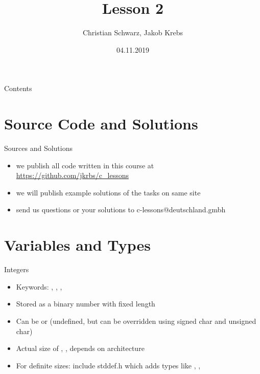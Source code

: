\documentclass[10pt,graphics,aspectratio=169,table]{beamer}
\title{Lesson 2}
\author{Christian Schwarz, Jakob Krebs}
\date{04.11.2019}
\begin{document}
\maketitle

\begin{frame}{Contents}
    \tableofcontents
\end{frame}


\section{Source Code and Solutions}
\begin{frame}{Sources and Solutions}
    \begin{itemize}
        \item we publish all code written in this course at \url{https://github.com/jkrbs/c_lessons}
        \item we will publish example solutions of the tasks on same site
        \item send us questions or your solutions to c-lessons@deutschland.gmbh
    \end{itemize}
\end{frame}
\section{Variables and Types}
    \begin{frame}{Integers}
    \begin{itemize}
        \item Keywords: , , , 
        \item Stored as a binary number with fixed length
        \item Can be  or  (undefined, but can be overridden using signed char and unsigned char)
        \item Actual size of , ,  depends on architecture
        \item For definite sizes: include stddef.h which adds types like , , 
    \end{itemize}
\end{frame}
\end{document}
